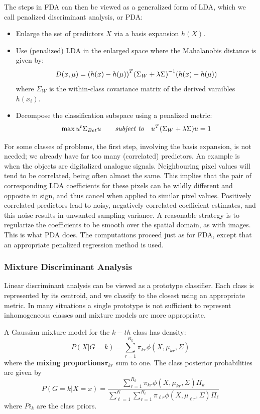 \documentclass[12pt, letterpaper]{article}
\theoremstyle{definition}
\DeclarePairedDelimiter\autobracket{(}{)}
\newcommand{\br}[1]{\autobracket*{#1}}
\begin{document}
The steps in FDA can then be viewed as a generalized form of LDA, which we call penalized discriminant analysis, or PDA:
\begin{itemize}
\item Enlarge the set of predictors $X$ via a basis expansion $h(X)$.
\item Use (penalized) LDA in the enlarged space where the Mahalanobis distance is given by:
\begin{equation}
D(x, \mu) = \br{h(x) - h(\mu)}^T\br{\Sigma_W+\lambda\Sigma}^{-1} \br{h(x) - h(\mu)}
\end{equation}
where $\Sigma_W$ is the within-class covariance matrix of the derived varaibles $h(x_i)$.
\item Decompose the classification subspace using a penalized metric:
\begin{equation}
\max u^t\Sigma_{Bet}u \quad\quad \textit{subject to} \quad u^T\br{\Sigma_W+\lambda\Sigma}u =1
\end{equation}
\end{itemize}
For some classes of problems, the first step, involving the basis expansion, is not needed; we already have far too many (correlated) predictors. An example is when the objects are digitalized analogue signals. Neighbouring pixel values will tend to be correlated, being often almost the same. This implies that the pair of corresponding LDA coefficients for these pixels can be wildly different and opposite in sign, and thus cancel when applied to similar pixel values. Positively correlated predictors lead to noisy, negatively correlated coefficient estimates, and this noise results in unwanted sampling variance. A reasonable strategy is to regularize the coefficients to be smooth over the spatial domain, as with images. This is what PDA does. The computations proceed just as for FDA, except that an appropriate penalized regression method is used.

\subsubsection{Mixture Discriminant Analysis}
Linear discriminant analysis can be viewed as a prototype classifier. Each class is represented by its centroid, and we classify to the closest using an appropriate metric. In many situations a single prototype is not sufficient to represent inhomogeneous classes and mixture models are more appropriate.

A Gaussian mixture model for the $k-th$ class has density:
\begin{equation}
P(X|G=k) = \sum_{r=1}^{R_k} \pi_{kr}\phi(X, \mu_{kr},\Sigma)
\end{equation}
where the \textbf{mixing proportions}$\pi_{kr}$ sum to one. The class posterior probabilities are given by
\begin{equation}
P(G=k|X=x) = \frac{\sum_{r=1}^{R_k} \pi_{kr}\phi(X, \mu_{kr},\Sigma)\Pi_k}{\sum_{\ell=1}^K\sum_{r=1}^{R_\ell} \pi_{\ell r}\phi(X, \mu_{\ell r},\Sigma)\Pi_\ell}
\end{equation}
where $Pi_k$ are the class priors.
\end{document}
